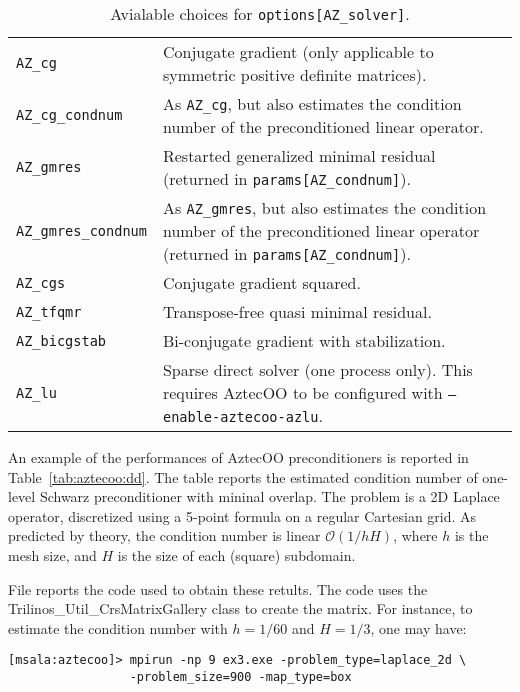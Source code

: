 \begin{table}
\begin{center}
\begin{tabular}{ | p{5cm} | p{10cm} | }
\hline
\verb!AZ_cg! & Conjugate gradient (only applicable to symmetric positive
definite matrices). \\
\verb!AZ_cg_condnum! & As \verb!AZ_cg!, but also estimates the condition
number of the preconditioned linear operator. \\
\verb!AZ_gmres! & Restarted generalized minimal residual (returned in
\verb!params[AZ_condnum]!). \\ 
\verb!AZ_gmres_condnum! & As \verb!AZ_gmres!, but also estimates the condition
number of the preconditioned linear operator  (returned in
\verb!params[AZ_condnum]!). \\ 
\verb!AZ_cgs! &  Conjugate gradient squared.\\
\verb!AZ_tfqmr! & Transpose-free quasi minimal residual. \\
\verb!AZ_bicgstab! &  Bi-conjugate gradient with stabilization.\\
\verb!AZ_lu! & Sparse direct solver (one process only). This requires
AztecOO to be configured with {\tt --enable-aztecoo-azlu}. \\
\hline
\end{tabular}
\caption{Avialable choices for {\tt options[AZ\_solver]}.}
\label{tab:aztec:solver}
\end{center}
\end{table}

An example of the performances of AztecOO preconditioners is reported in
Table~\ref{tab:aztecoo:dd}. The table reports the estimated condition
number of one-level Schwarz preconditioner with mininal overlap. The
problem is a 2D Laplace operator, discretized using a 5-point formula on
a regular Cartesian grid. As predicted by theory, the condition number
is linear $\mathcal{O}(1/hH)$, where $h$ is the mesh size, and $H$ is
the size of each (square) subdomain.

File  reports the code used to obtain these
retults. The code uses the Trilinos\_Util\_CrsMatrixGallery class to
create the matrix. For instance, to estimate the condition number with
$h=1/60$ and $H=1/3$, one may have:
\begin{verbatim}
[msala:aztecoo]> mpirun -np 9 ex3.exe -problem_type=laplace_2d \
                 -problem_size=900 -map_type=box
\end{verbatim}

